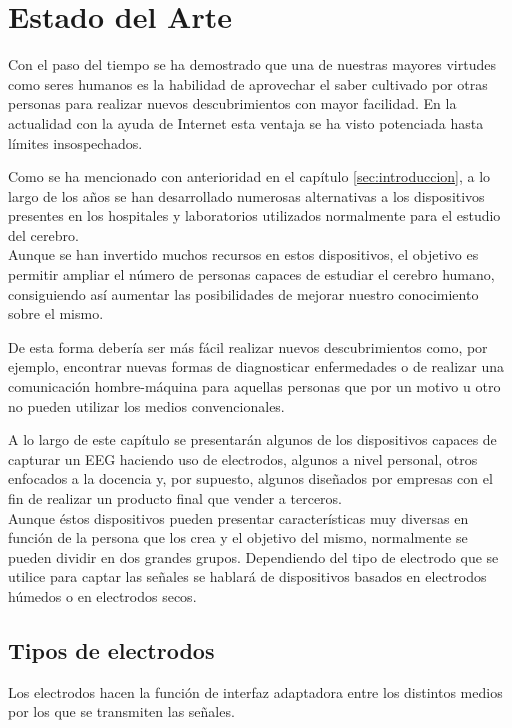 \chapter{Estado del Arte\label{sec:EstadoDelArte}}

Con el paso del tiempo se ha demostrado que una de nuestras mayores virtudes como seres humanos es la habilidad de aprovechar el saber cultivado por otras personas para realizar nuevos descubrimientos con mayor facilidad. En la actualidad con la ayuda de Internet esta ventaja se ha visto potenciada hasta límites insospechados.

Como se ha mencionado con anterioridad en el capítulo \ref{sec:introduccion}, a lo largo de los años se han desarrollado numerosas alternativas a los dispositivos presentes en los hospitales y laboratorios utilizados normalmente para el estudio del cerebro. 
\\Aunque se han invertido muchos recursos en estos dispositivos, el objetivo es permitir ampliar el número de personas capaces de estudiar el cerebro humano, consiguiendo  así aumentar las posibilidades de mejorar nuestro conocimiento sobre el mismo.

De esta forma debería ser más fácil realizar nuevos descubrimientos como, por ejemplo, encontrar nuevas formas de diagnosticar enfermedades o de realizar una comunicación hombre-máquina para aquellas personas que por un motivo u otro no pueden utilizar los medios convencionales.

A lo largo de este capítulo se presentarán algunos de los dispositivos capaces de capturar un EEG haciendo uso de electrodos, algunos a nivel personal, otros enfocados a la docencia y, por supuesto, algunos diseñados por empresas con el fin de realizar un producto final que vender a terceros.
\\Aunque éstos dispositivos pueden presentar características muy diversas en función de la persona que los crea y el objetivo del mismo, normalmente se pueden dividir en dos grandes grupos. Dependiendo del tipo de electrodo que se utilice para captar las señales se hablará de dispositivos basados en electrodos húmedos o en electrodos secos.

\section{Tipos de electrodos\label{sec:Tipos_Electrodos}}

Los electrodos hacen la función de interfaz adaptadora entre los distintos medios por los que se transmiten las señales.

